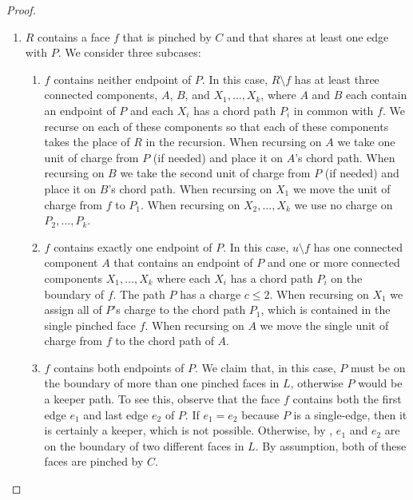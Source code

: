 \documentclass{patmorin}
\begin{document}
\begin{proof}
\begin{enumerate}
     \item $R$ contains a face $f$ that is pinched by $C$ and that shares
     at least one edge with $P$.  We consider three subcases:
     \begin{enumerate}
	\item $f$ contains neither endpoint of $P$. In this case,
	$R\setminus f$ has at least three connected components, $A$, $B$,
	and $X_1,\ldots,X_k$, where $A$ and $B$ each contain an endpoint
	of $P$ and each $X_i$ has a chord path $P_i$ in common
	with $f$.  We recurse on each of these components so that each
	of these components takes the place of $R$ in the recursion. When
	recursing on $A$ we take one unit of charge from $P$ (if needed)
	and place it on $A$'s chord path.  When recursing on $B$ we take
	the second unit of charge from $P$ (if needed) and place it on
	$B$'s chord path.  When recursing on $X_1$ we move the unit of
	charge from $f$ to $P_1$.  When recursing on $X_2,\ldots,X_k$
	we use no charge on $P_2,\ldots,P_k$.

	\item $f$ contains exactly one endpoint of $P$.  In this case,
	$u\setminus f$ has one connected component $A$ that contains
	an endpoint of $P$ and one or more connected components
	$X_1,\ldots,X_k$ where each $X_i$ has a chord path $P_i$ on the
	boundary of $f$.
	The path $P$ has a charge $c\le 2$.  When recursing on $X_1$
	we assign all of $P$'s charge to the chord path $P_1$, which is
	contained in the single pinched face $f$.
	When recursing on $A$ we move the single unit of charge from $f$
	to the chord path of $A$.

        \item $f$ contains both endpoints of $P$.  We claim that,
        in this case, $P$ must be on the boundary of more than one
        pinched faces in $L$, otherwise $P$ would be a keeper path.
        To see this, observe that the face $f$ contains both the first
        edge $e_1$ and last edge $e_2$ of $P$. If $e_1=e_2$ because $P$
        is a single-edge, then it is certainly a keeper, which is not
        possible. Otherwise, by
        , $e_1$ and $e_2$ are on the boundary of
        two different faces in $L$.  By assumption, both of these faces
        are pinched by $C$.


\end{enumerate}
\end{enumerate}
\end{proof}
\end{document}

